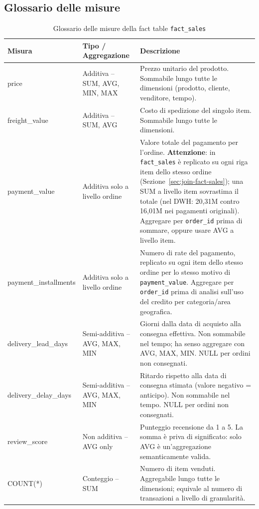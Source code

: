 \documentclass[12pt,a4paper]{article}
\begin{document}
\subsection{Glossario delle misure}
\label{sec:misure}

\begin{table}[H]
  \centering
  \footnotesize
  \caption{Glossario delle misure della fact table \texttt{fact\_sales}}
  \label{tab:misure}
  \begin{tabular}{>{\ttfamily}l
                  >{\raggedright}p{3.5cm}
                  >{\raggedright\arraybackslash}p{5cm}}
    \toprule
    \textbf{Misura} & \textbf{Tipo / Aggregazione} & \textbf{Descrizione} \\
    \midrule
    price                & Additiva -- SUM, AVG, MIN, MAX &
      Prezzo unitario del prodotto. Sommabile lungo tutte le dimensioni (prodotto,
      cliente, venditore, tempo). \\
    freight\_value       & Additiva -- SUM, AVG &
      Costo di spedizione del singolo item. Sommabile lungo tutte le dimensioni. \\
    payment\_value       & Additiva solo a livello ordine &
      Valore totale del pagamento per l'ordine. \textbf{Attenzione}: in
      \texttt{fact\_sales} è replicato su ogni riga item dello stesso ordine
      (Sezione~\ref{sec:join-fact-sales}); una SUM a livello item sovrastima il
      totale (nel DWH: 20,31M contro 16,01M nei pagamenti originali). Aggregare
      per \texttt{order\_id} prima di sommare, oppure usare AVG a livello item. \\
    payment\_installments & Additiva solo a livello ordine &
      Numero di rate del pagamento, replicato su ogni item dello stesso ordine per
      lo stesso motivo di \texttt{payment\_value}. Aggregare per \texttt{order\_id}
      prima di analisi sull'uso del credito per categoria/area geografica. \\
    delivery\_lead\_days & Semi-additiva -- AVG, MAX, MIN &
      Giorni dalla data di acquisto alla consegna effettiva. Non sommabile nel
      tempo; ha senso aggregare con AVG, MAX, MIN. NULL per ordini non consegnati. \\
    delivery\_delay\_days & Semi-additiva -- AVG, MAX, MIN &
      Ritardo rispetto alla data di consegna stimata (valore negativo = anticipo).
      Non sommabile nel tempo. NULL per ordini non consegnati. \\
    review\_score        & Non additiva -- AVG only &
      Punteggio recensione da 1 a 5. La somma è priva di significato: solo AVG
      è un'aggregazione semanticamente valida. \\
    COUNT(*)             & Conteggio -- SUM &
      Numero di item venduti. Aggregabile lungo tutte le dimensioni; equivale al
      numero di transazioni a livello di granularità. \\
    \bottomrule
  \end{tabular}
\end{table}
\end{document}
